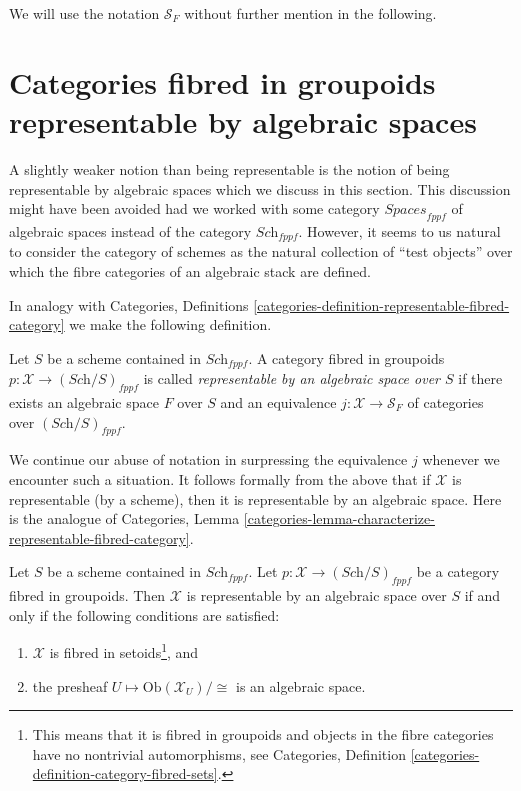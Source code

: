 \medskip\noindent
We will use the notation $\mathcal{S}_F$ without further mention in the
following.




\section{Categories fibred in groupoids representable by algebraic spaces}
\label{section-representable-by-algebraic-spaces}

\noindent
A slightly weaker notion than being representable is the notion of
being representable by algebraic spaces which we discuss in this section.
This discussion might have been avoided had we worked with some category
$\textit{Spaces}_{fppf}$ of algebraic spaces instead of the category
$\textit{Sch}_{fppf}$. However, it seems to us natural to consider the
category of schemes as the natural collection of ``test objects'' over
which the fibre categories of an algebraic stack are defined.

\medskip\noindent
In analogy with Categories, Definitions
\ref{categories-definition-representable-fibred-category}
we make the following definition.

\begin{definition}
\label{definition-representable-by-algebraic-space}
Let $S$ be a scheme contained in $\textit{Sch}_{fppf}$.
A category fibred in groupoids $p : \mathcal{X} \to (\textit{Sch}/S)_{fppf}$
is called {\it representable by an algebraic space over $S$}
if there exists an algebraic space $F$ over $S$ and an equivalence
$j : \mathcal{X} \to \mathcal{S}_F$
of categories over $(\textit{Sch}/S)_{fppf}$.
\end{definition}

\noindent
We continue our abuse of notation in surpressing the equivalence $j$
whenever we encounter such a situation.
It follows formally from the above that if $\mathcal{X}$ is
representable (by a scheme), then it is representable by an
algebraic space. Here is the analogue of
Categories,
Lemma \ref{categories-lemma-characterize-representable-fibred-category}.

\begin{lemma}
\label{lemma-characterize-representable-by-space}
Let $S$ be a scheme contained in $\textit{Sch}_{fppf}$.
Let $p : \mathcal{X} \to (\textit{Sch}/S)_{fppf}$
be a category fibred in groupoids.
Then $\mathcal{X}$ is representable by an algebraic space over $S$
if and only if the following conditions are satisfied:
\begin{enumerate}
\item $\mathcal{X}$ is fibred in setoids\footnote{This means that
it is fibred in groupoids and objects in the fibre categories
have no nontrivial automorphisms, see Categories,
Definition \ref{categories-definition-category-fibred-sets}.}, and
\item the presheaf $U \mapsto \text{Ob}(\mathcal{X}_U)/\!\!\cong$ is
an algebraic space.
\end{enumerate}
\end{lemma}


